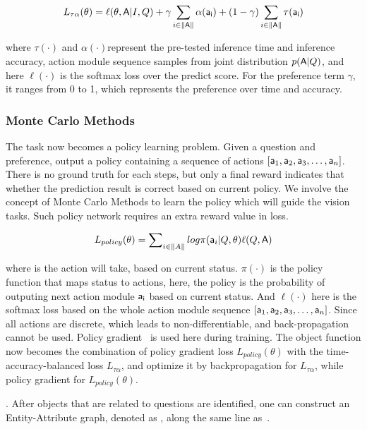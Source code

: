 \begin{small}
\begin{equation} 
    L_{\tau\alpha}(\theta) = \ell(\theta,{\mathsf{A}}|I, Q) + \gamma\sum_{i\in\|{\mathsf{A}}\|}\alpha({\mathsf{a_i}}) + (1-\gamma)\sum_{i\in\|{\mathsf{A}}\|}\tau({\mathsf{a_i}})
\end{equation}
\end{small}

\noindent where $\tau(\cdot)$ and $\alpha(\cdot)$represent the pre-tested inference time and inference accuracy, action module sequence  samples from joint distribution $p({\mathsf{A}}|Q)$, and here $\ell(\cdot)$ is the softmax loss over the predict score. For the preference term $\gamma$, it ranges from 0 to 1, which represents the preference over time and accuracy.

\subsubsection{Monte Carlo Methods}
\label{sec-MC}
\hspace{\parindent} The task now becomes a policy learning problem. Given a question and preference, output a policy containing a sequence of actions $[{\mathsf{a}}_1,{\mathsf{a}}_2,{\mathsf{a}}_3,\dots,{\mathsf{a}}_n]$. There is no ground truth for each steps, but only a final reward indicates that whether the prediction result is correct based on current policy. We involve the concept of Monte Carlo Methods to learn the policy which will guide the vision tasks. Such policy network requires an extra reward value in loss.

\begin{small}
\begin{equation} 
    L_{policy}(\theta) = \sum\nolimits_{i\in\|A\|} log\pi({\mathsf{a}}_{i}|Q,\theta)\ell(Q,{\mathsf{A}})
\end{equation}
\end{small}

\noindent where  is the action will take, based on current status. $\pi(\cdot)$ is the policy function that maps status to actions, here, the policy is the probability of outputing next action module ${\mathsf{a_{i}}}$ based on current status. And $\ell(\cdot)$ here is the softmax loss based on the whole action module sequence $[{\mathsf{a}}_1,{\mathsf{a}}_2,{\mathsf{a}}_3,\dots,{\mathsf{a}}_n]$. Since all actions are discrete, which leads to non-differentiable, and back-propagation cannot be used. Policy gradient~\cite{Liu_2017_ICCV} is used here during training. The object function now becomes the combination of policy gradient loss $L_{policy}(\theta)$ with the time-accuracy-balanced loss $L_{\tau\alpha}$, and optimize it by backpropagation for $L_{\tau\alpha}$, while policy gradient for $L_{policy}(\theta)$.



. After objects that are related to questions are identified, one can construct an Entity-Attribute graph, denoted as , along the same line as~\cite{peixi2019}. 



